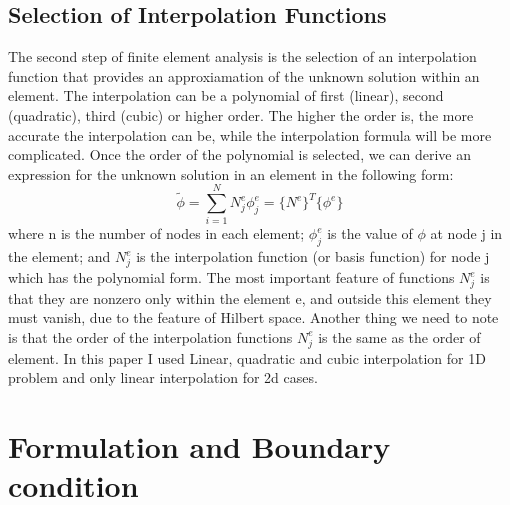 \documentclass[journal]{IEEEtran}
\begin{document}
\subsection{Selection of Interpolation Functions}
The second step of finite element analysis is the selection of an interpolation function that provides an approxiamation of the unknown solution within an element. The interpolation can be a polynomial of first (linear), second (quadratic), third (cubic) or higher order. The higher the order is, the more accurate the interpolation can be, while the interpolation formula will be more complicated. Once the order of the polynomial is selected, we can derive an expression for the unknown solution in an element in the following form:
\begin{equation}
\widetilde{\phi} = \sum_{i=1}^{N} N^e_j {\phi}^e_j = \{N^e\}^T\{\phi^e\}
\end{equation}
where n is the number of nodes in each element;  ${{\phi}^e_j}$ is the value of ${\phi}$ at node j in the element; and ${N^e_j}$ is the interpolation function (or basis function) for node j which has the polynomial form. The most important feature of functions ${N^e_j}$ is that they are nonzero only within the element e, and outside this element they must vanish, due to the feature of Hilbert space. Another thing we need to note is that the order of the interpolation functions ${N^e_j}$ is the same as the order of element. In this paper I used Linear, quadratic and cubic interpolation for 1D problem and only linear interpolation for 2d cases.   


\section{Formulation and Boundary condition}
\end{document}
